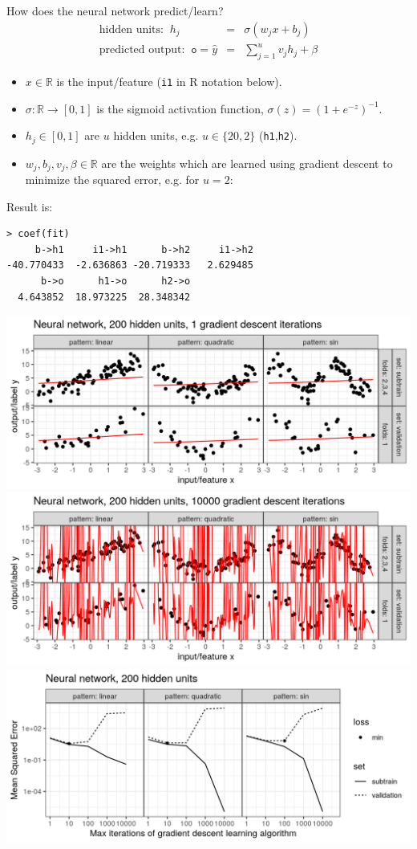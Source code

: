 \documentclass{article}
\begin{document}
{How does the neural network predict/learn?}
  \begin{eqnarray*}
    \text{hidden units: }\ h_j &=& \sigma(w_j x + b_j) \\
    \text{predicted output: }\  \texttt{o} = \hat y &=& \sum_{j=1}^u v_j h_j + \beta
  \end{eqnarray*}
  \begin{itemize}
  \item $x\in\mathbb R$ is the input/feature (\texttt{i1} in R notation below).
  \item $\sigma:\mathbb R\rightarrow [0,1]$ is the sigmoid activation
    function, $\sigma(z)=(1+e^{-z})^{-1}$.
  \item $h_j\in[0,1]$ are $u$ hidden units, e.g. $u\in\{20, 2\}$ (\texttt{h1},\texttt{h2}).
  \item $w_j,b_j,v_j,\beta\in\mathbb R$ are the weights which are
    learned using gradient descent to minimize the squared error, e.g. for $u=2$:
  \end{itemize}
  Result is:
\begin{verbatim}
> coef(fit)
     b->h1     i1->h1      b->h2     i1->h2 
-40.770433  -2.636863 -20.719333   2.629485 
      b->o      h1->o      h2->o 
  4.643852  18.973225  28.348342 
\end{verbatim}

  \includegraphics[width=\textwidth]{figure-overfitting-pred-units=200-maxit=1.png}
  \includegraphics[width=\textwidth]{figure-overfitting-pred-units=200-maxit=10000.png}
  \includegraphics[width=\textwidth]{figure-overfitting-data-loss-200.png}
\end{document}
